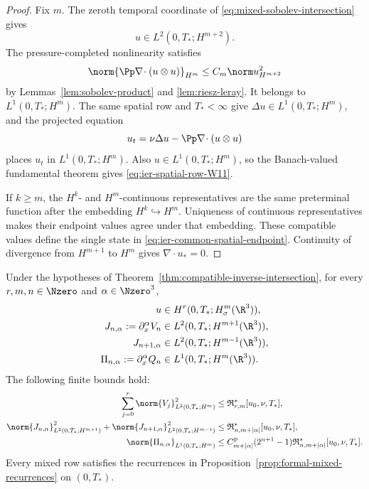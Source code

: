 \begin{proof}
Fix \(m\).  The zeroth temporal coordinate of
\eqref{eq:mixed-sobolev-intersection} gives
\[
 u\in L^2(0,T_*;H^{m+2}).
\]
The pressure-completed nonlinearity satisfies
\[
 \norm{\Pp\nabla\!\cdot(u\otimes u)}_{H^m}
 \le C_m\norm u_{H^{m+2}}^2
\]
by Lemmas~\ref{lem:sobolev-product} and \ref{lem:riesz-leray}.  It belongs
to \(L^1(0,T_*;H^m)\).  The same spatial row and \(T_*<\infty\) give
\(\Delta u\in L^1(0,T_*;H^m)\), and the projected equation
\[
 u_t=\nu\Delta u-\Pp\nabla\!\cdot(u\otimes u)
\]
places \(u_t\) in \(L^1(0,T_*;H^m)\).  Also
\(u\in L^1(0,T_*;H^m)\), so the Banach-valued fundamental theorem gives
\eqref{eq:ier-spatial-row-W11}.

If \(k\ge m\), the \(H^k\)- and \(H^m\)-continuous representatives are
the same preterminal function after the embedding \(H^k\hookrightarrow
H^m\).  Uniqueness of continuous representatives makes their endpoint
values agree under that embedding.  These compatible values define the
single state in \eqref{eq:ier-common-spatial-endpoint}.  Continuity of
divergence from \(H^{m+1}\) to \(H^m\) gives \(\nabla\cdot u_*=0\).
\end{proof}

\begin{corollary}
\label{cor:ier-whole-terminal-mixed-jet}
Under the hypotheses of Theorem~\ref{thm:compatible-inverse-intersection},
for every \(r,m,n\in\Nzero\) and \(\alpha\in\Nzero^3\),
\begin{align}
 u&\in H^r(0,T_*;H^m_\sigma(\R^3)),
 \label{eq:ier-whole-terminal-bochner}\\
 J_{n,\alpha}:=\partial_x^\alpha V_n
 &\in L^2(0,T_*;H^{m+1}(\R^3)),
 \label{eq:ier-whole-terminal-mixed-upper}\\
 J_{n+1,\alpha}
 &\in L^2(0,T_*;H^{m-1}(\R^3)),
 \label{eq:ier-whole-terminal-mixed-lower}\\
 \Pi_{n,\alpha}:=\partial_x^\alpha Q_n
 &\in L^1(0,T_*;H^m(\R^3)).
 \label{eq:ier-whole-terminal-mixed-pressure}
\end{align}
The following finite bounds hold:
\begin{align}
 \sum_{j=0}^{r}\norm{V_j}_{L^2(0,T_*;H^m)}^2
 &\le\mathfrak R_{r,m}^*[u_0,\nu,T_*],
 \label{eq:ier-finite-bochner-bound}\\
 \norm{J_{n,\alpha}}_{L^2(0,T_*;H^{m+1})}^2
 +\norm{J_{n+1,\alpha}}_{L^2(0,T_*;H^{m-1})}^2
 &\le\mathfrak R_{n,m+|\alpha|}^*[u_0,\nu,T_*],
 \label{eq:ier-finite-mixed-bound}\\
 \norm{\Pi_{n,\alpha}}_{L^1(0,T_*;H^m)}
 &\le C_{m+|\alpha|}^{\rm p}(2^{n+1}-1)
 \mathfrak R_{n,m+|\alpha|}^*[u_0,\nu,T_*].
 \label{eq:ier-finite-mixed-pressure-bound}
\end{align}
Every mixed row satisfies the recurrences in
Proposition~\ref{prop:formal-mixed-recurrences} on \((0,T_*)\).
\end{corollary}

